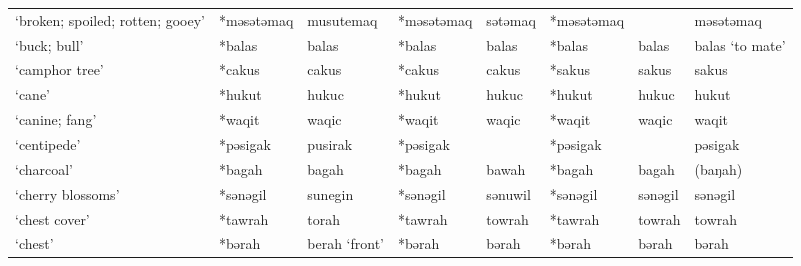 \begin{landscape}
\begin{longtable}[c]{@{}p{3cm}<{\raggedright}p{2.75cm}<{\raggedright}p{2.75cm}<{\raggedright}p{2.75cm}<{\raggedright}p{2.75cm}<{\raggedright}p{2.75cm}<{\raggedright}p{2.75cm}<{\raggedright}p{2.75cm}<{\raggedright}@{}}
`broken; spoiled; rotten; gooey'                     & *məsətəmaq   & musutemaq                     & *məsətəmaq     & sətəmaq                    & *məsətəmaq       &                          & məsətəmaq                         \\
`buck; bull'                                         & *balas       & balas                         & *balas         & balas                      & *balas           & balas                    & balas `to mate'                   \\
`camphor tree'                                       & *cakus       & cakus                         & *cakus         & cakus                      & *sakus           & sakus                    & sakus                             \\
`cane'                                               & *hukut       & hukuc                         & *hukut         & hukuc                      & *hukut           & hukuc                    & hukut                             \\
`canine; fang'                                       & *waqit       & waqic                         & *waqit         & waqic                      & *waqit           & waqic                    & waqit                             \\
`centipede'                                          & *pəsigak     & pusirak                       & *pəsigak       &                            & *pəsigak         &                          & pəsigak                           \\
`charcoal'                                           & *bagah       & bagah                         & *bagah         & bawah                      & *bagah           & bagah                    & (baŋah)                           \\
`cherry blossoms'                                    & *sənəgil     & sunegin                       & *sənəgil       & sənuwil                    & *sənəgil         & sənəgil                  & sənəgil                           \\
`chest cover'                                        & *tawrah      & torah                         & *tawrah        & towrah                     & *tawrah          & towrah                   & towrah                            \\
`chest'                                              & *bərah       & berah `front'                 & *bərah         & bərah                      & *bərah           & bərah                    & bərah                             \\

\end{longtable}
\end{landscape}
